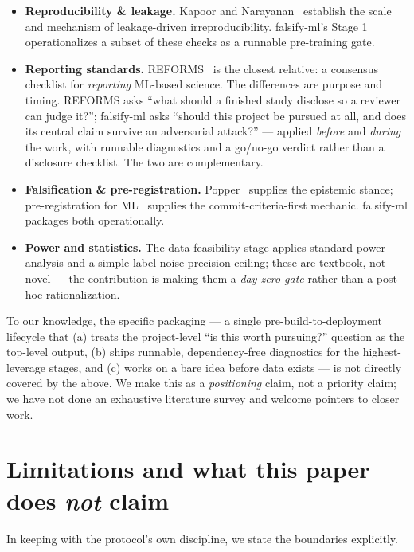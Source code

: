 \documentclass[11pt]{article}
\begin{document}
\begin{itemize}[leftmargin=*]
\item \textbf{Reproducibility \& leakage.} Kapoor and Narayanan~\cite{kapoor2023leakage} establish the
scale and mechanism of leakage-driven irreproducibility. falsify-ml's Stage 1 operationalizes a subset
of these checks as a runnable pre-training gate.
\item \textbf{Reporting standards.} REFORMS~\cite{kapoor2024reforms} is the closest relative: a
consensus checklist for \emph{reporting} ML-based science. The differences are purpose and timing.
REFORMS asks ``what should a finished study disclose so a reviewer can judge it?''; falsify-ml asks
``should this project be pursued at all, and does its central claim survive an adversarial attack?''
--- applied \emph{before} and \emph{during} the work, with runnable diagnostics and a go/no-go verdict
rather than a disclosure checklist. The two are complementary.
\item \textbf{Falsification \& pre-registration.} Popper~\cite{popper1959} supplies the epistemic
stance; pre-registration for ML~\cite{prereg2020} supplies the commit-criteria-first mechanic.
falsify-ml packages both operationally.
\item \textbf{Power and statistics.} The data-feasibility stage applies standard power analysis and a
simple label-noise precision ceiling; these are textbook, not novel --- the contribution is making
them a \emph{day-zero gate} rather than a post-hoc rationalization.
\end{itemize}

To our knowledge, the specific packaging --- a single pre-build-to-deployment lifecycle that (a)
treats the project-level ``is this worth pursuing?'' question as the top-level output, (b) ships
runnable, dependency-free diagnostics for the highest-leverage stages, and (c) works on a bare idea
before data exists --- is not directly covered by the above. We make this as a \emph{positioning}
claim, not a priority claim; we have not done an exhaustive literature survey and welcome pointers to
closer work.

\section{Limitations and what this paper does \emph{not} claim}
\label{sec:limits}

In keeping with the protocol's own discipline, we state the boundaries explicitly.
\end{document}
